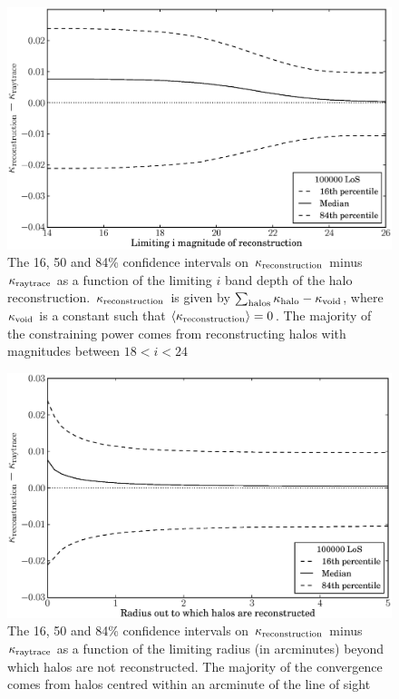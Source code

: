 \documentclass[useAMS,usenatbib]{mn2e}
\begin{document}
\begin{figure}
\includegraphics[width=\columnwidth]{figs/mag_scatter.eps}
\caption[magcut]{The 16, 50 and 84\% confidence intervals on $\kappa_{\rm reconstruction}$ minus $\kappa_{\rm raytrace}$ as a function of the limiting $i$ band depth of the halo reconstruction. $\kappa_{\rm reconstruction}$ is given by $\sum_{\rm halos} \kappa_{\rm halo}-\kappa_{\rm void}$, where $\kappa_{\rm void}$ is a constant such that $\left\langle\kappa_{\rm reconstruction}\right\rangle=0$. The majority of the constraining power comes from reconstructing halos with magnitudes between $18<i<24$}
\label{fig:magcut}
\end{figure}
\begin{figure}
\includegraphics[width=\columnwidth]{figs/radius_scatter.eps}
\caption[radius cut]{The 16, 50 and 84\% confidence intervals on $\kappa_{\rm reconstruction}$ minus $\kappa_{\rm raytrace}$ as a function of the limiting radius (in arcminutes) beyond which halos are not reconstructed. The majority of the convergence comes from halos centred within an arcminute of the line of sight}
\label{fig:radcut}
\end{figure}
\end{document}
